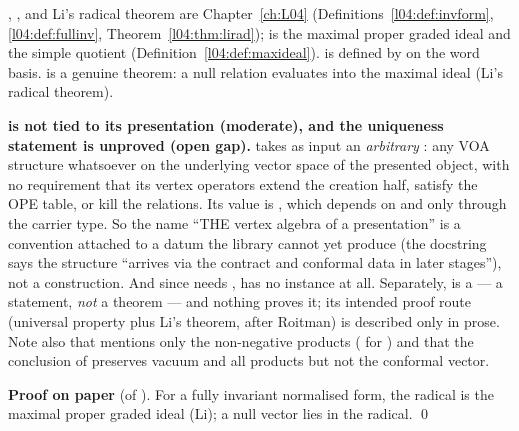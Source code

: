 \begin{dictionary}
, ,  and Li's radical theorem are Chapter~\ref{ch:L04}
(Definitions~\ref{l04:def:invform}, \ref{l04:def:fullinv}, Theorem~\ref{l04:thm:lirad}); \allowbreak{} is the
maximal proper graded ideal and  the simple quotient (Definition~\ref{l04:def:maxideal}).  is defined
by  on the word basis. \allowbreak{}\allowbreak{}\allowbreak{} is a genuine theorem: a null relation evaluates into
the maximal ideal (Li's radical theorem).
\end{dictionary}

\begin{warning}
\textbf{ is not tied to its presentation (moderate), and the uniqueness statement is unproved (open gap).} 
takes as input an \emph{arbitrary} : any VOA structure whatsoever on the underlying vector
space of the presented object, with no requirement that its vertex operators extend the creation half, satisfy the OPE table, or kill
the relations. Its value is \allowbreak{}, which depends on  and  only through the carrier type. So
the name ``THE vertex algebra of a presentation'' is a convention attached to a datum the library cannot yet produce (the docstring says
the structure ``arrives via the  contract and conformal data in later stages''), not a construction. And since
 needs ,  has no instance at all. Separately, \allowbreak{}\allowbreak{} is a
 --- a statement, \emph{not} a theorem --- and nothing proves it; its intended proof route (universal property plus Li's
theorem, after Roitman) is described only in prose. Note also that  mentions only the non-negative products
( for ) and that the conclusion of \allowbreak{}\allowbreak{} preserves vacuum and all products but not the
conformal vector.
\end{warning}

\textbf{Proof on paper} (of \allowbreak{}\allowbreak{}\allowbreak{}). For a fully invariant normalised form, the radical is the maximal proper
graded ideal (Li); a null vector lies in the radical. \qed

